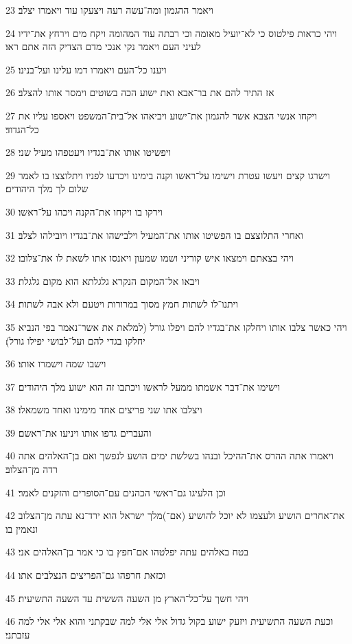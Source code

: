 \par 23 ויאמר ההגמון ומה־עשה רעה ויצעקו עוד ויאמרו יצלב׃
\par 24 ויהי כראות פילטוס כי לא־יועיל מאומה וכי רבתה עוד המהומה ויקח מים וירחץ את־ידיו לעיני העם ויאמר נקי אנכי מדם הצדיק הזה אתם ראו׃
\par 25 ויענו כל־העם ויאמרו דמו עלינו ועל־בנינו׃
\par 26 אז התיר להם את בר־אבא ואת ישוע הכה בשוטים וימסר אותו להצלב׃
\par 27 ויקחו אנשי הצבא אשר להגמון את־ישוע ויביאהו אל־בית־המשפט ויאספו עליו את כל־הגדוד׃
\par 28 ויפשיטו אותו את־בגדיו ויעטפהו מעיל שני׃
\par 29 וישרגו קצים ויעשו עטרת וישימו על־ראשו וקנה בימינו ויכרעו לפניו ויתלוצצו בו לאמר שלום לך מלך היהודים׃
\par 30 וירקו בו ויקחו את־הקנה ויכהו על־ראשו׃
\par 31 ואחרי התלוצצם בו הפשיטו אותו את־המעיל וילבישהו את־בגדיו ויובילהו לצלב׃
\par 32 ויהי בצאתם וימצאו איש קוריני ושמו שמעון ויאנסו אתו לשאת לו את־צלובו׃
\par 33 ויבאו אל־המקום הנקרא גלגלתא הוא מקום גלגלת׃
\par 34 ויתנו־לו לשתות חמץ מסוך במרורות ויטעם ולא אבה לשתות׃
\par 35 ויהי כאשר צלבו אותו ויחלקו את־בגדיו להם ויפלו גורל (למלאת את אשר־נאמר בפי הנביא יחלקו בגדי להם ועל־לבושי יפילו גורל)׃
\par 36 וישבו שמה וישמרו אותו׃
\par 37 וישימו את־דבר אשמתו ממעל לראשו ויכתבו זה הוא ישוע מלך היהודים׃
\par 38 ויצלבו אתו שני פריצים אחד מימינו ואחד משמאלו׃
\par 39 והעברים גדפו אותו ויניעו את־ראשם׃
\par 40 ויאמרו אתה ההרס את־ההיכל ובנהו בשלשת ימים הושע לנפשך ואם בן־האלהים אתה רדה מן־הצלוב׃
\par 41 וכן הלעיגו גם־ראשי הכהנים עם־הסופרים והזקנים לאמר׃
\par 42 את־אחרים הושיע ולעצמו לא יוכל להושיע (אם־)מלך ישראל הוא ירד־נא עתה מן־הצלוב ונאמין בו׃
\par 43 בטח באלהים עתה יפלטהו אם־חפץ בו כי אמר בן־האלהים אני׃
\par 44 וכזאת חרפהו גם־הפריצים הנצלבים אתו׃
\par 45 ויהי חשך על־כל־הארץ מן השעה הששית עד השעה התשיעית׃
\par 46 וכעת השעה התשיעית ויזעק ישוע בקול גדול אלי אלי למה שבקתני והוא אלי אלי למה עזבתני׃
